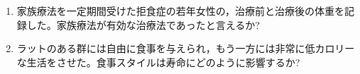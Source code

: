 \begin{enumerate}
	\item 家族療法を一定期間受けた拒食症の若年女性の，治療前と治療後の体重を記録した。家族療法が有効な治療法であったと言えるか?
	\item ラットのある群には自由に食事を与えられ，もう一方には非常に低カロリーな生活をさせた。食事スタイルは寿命にどのように影響するか?
\end{enumerate}
